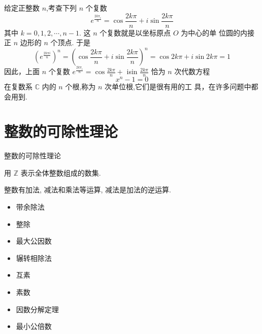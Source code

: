 \documentclass[13pt]{beamer}
\begin{document}
\begin{frame}
给定正整数 $n$,考查下列 $n$ 个复数
\[
{e}^{\frac{2 k \pi_{{i}}}{n}}=\cos \frac{2 k \pi}{n}+i\operatorname{sin} \frac{2 k \pi}{n}
\]
其中 $k=0,1,2, \cdots, n-1.$ 这 $n$ 个复数就是以坐标原点 $O$ 为中心的单 位圆的内接正 $n$ 边形的 $n$ 个顶点.
于是
\[
\left({e}^{\frac{2 {k\pi i}}{n}}\right)^{n}=\left(\cos \frac{2 k \pi}{n}+i \operatorname{sin} \frac{2 k \pi}{n}\right)^{n}=\cos 2 k \pi+{i} \sin 2 k \pi=1
\]
因此，上面 $n$ 个复数 ${e}^{\frac{2 k \pi_{{i}}}{n}}=\cos \frac{2 k \pi}{n}+$ isin $\frac{2 k \pi}{n}$ 恰为 $n$ 次代数方程 $$x^{n}-1=0$$ 在复数系 $\mathbb{C}$ 内的 $n$ 个根,称为 $n$ 次单位根,它们是很有用的工
具，在许多问题中都会用到.
\end{frame}


\section{整数的可除性理论}
\begin{frame}{整数的可除性理论}


用 $\mathbb{Z}$ 表示全体整数组成的数集.


整数有加法, 减法和乘法等运算, 减法是加法的逆运算. 

%
%
\begin{itemize}
\item 带余除法
\item 整除
\item 最大公因数
\item 辗转相除法
\item 互素
\item 素数
\item 因数分解定理
\item 最小公倍数
\end{itemize}
\end{frame}
\end{document}
